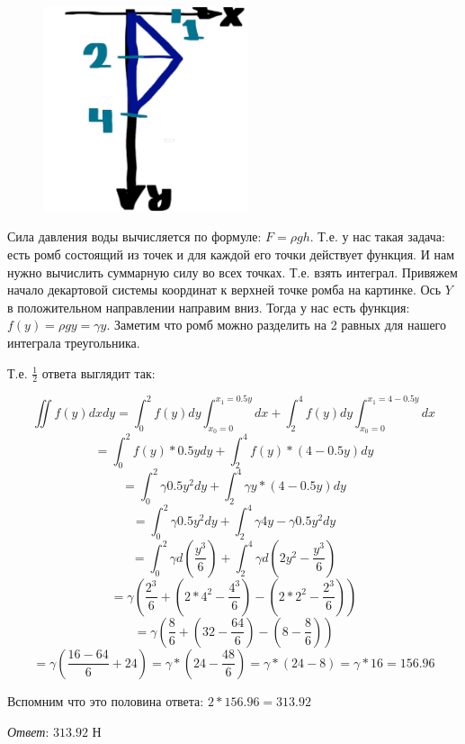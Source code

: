 \begin{minipage}{\linewidth}

    \begin{figure}
        \includegraphics[height=60mm]{images/1a2}
    \end{figure}

    Сила давления воды вычисляется по формуле: $F = \rho g h$. Т.е. у нас такая задача: есть ромб состоящий из точек и для каждой его точки
    действует функция. И нам нужно вычислить суммарную силу во всех точках. Т.е. взять интеграл. Привяжем начало декартовой системы координат к верхней точке ромба на картинке.
    Ось $Y$ в положительном направлении направим вниз. Тогда у нас есть функция: $f(y) = \rho g y = \gamma y$. Заметим что ромб можно разделить на 2 равных для нашего интеграла треугольника.

\end{minipage}

\vspace{14mm}

Т.е. $\frac{1}{2}$ ответа выглядит так:

\[\iint{f(y)}dxdy = \int_{0}^{2} f(y) dy \int_{x_0 = 0}^{x_1 = 0.5y} dx +
\int_{2}^{4} f(y) dy \int_{x_0 = 0}^{x_1 = 4-0.5y} dx\]
\[ = \int_{0}^{2} f(y)*0.5y dy + \int_{2}^{4} f(y) * (4-0.5y) dy\]
\[ = \int_{0}^{2} \gamma 0.5y^2 dy + \int_{2}^{4} \gamma y * (4 - 0.5y) dy\]
\[ = \int_{0}^{2} \gamma 0.5y^2 dy + \int_{2}^{4} \gamma 4 y - \gamma 0.5y^2 dy\]
\[ = \int_{0}^{2} \gamma d(\frac{y^3}{6})  + \int_{2}^{4} \gamma d( 2 y^2 - \frac{y^3}{6} )\]
\[ = \gamma (\frac{2^3}{6} + ( 2* 4^2 - \frac{4^3}{6} ) - ( 2* 2^2 - \frac{2^3}{6} ) )\]
\[ = \gamma (\frac{8}{6} + ( 32 - \frac{64}{6} ) - ( 8 - \frac{8}{6} ) )\]
\[ = \gamma (\frac{16-64}{6} + 24 ) = \gamma *( 24 - \frac{48}{6}) =  \gamma * (24 - 8) =  \gamma * 16 = 156.96\]

Вспомним что это половина ответа: $2 * 156.96 = 313.92$

\textit{Ответ}: $313.92$ Н
\clearpage
